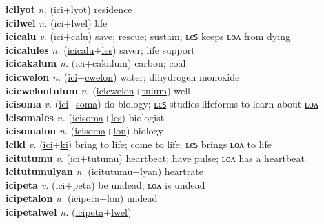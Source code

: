 \textbf{icilyot} \textit{n.} (\hyperref[ici]{ici}+\hyperref[lyot]{lyot})
residence \label{icilyot} \\
\textbf{icilwel} \textit{n.} (\hyperref[ici]{ici}+\hyperref[lwel]{lwel})
life \label{icilwel} \\
\textbf{icicalu} \textit{v.} (\hyperref[ici]{ici}+\hyperref[calu]{calu})
save; rescue; sustain; \hyperref[icicalules]{ʟєꜱ} keeps ʟᴏᴧ from dying \label{icicalu} \\
\textbf{icicalules} \textit{n.} (\hyperref[icicalu]{icicalu}+\hyperref[les]{les})
saver; life support \label{icicalules} \\
\textbf{icicakalum} \textit{n.} (\hyperref[ici]{ici}+\hyperref[cakalum]{cakalum})
carbon; coal \label{icicakalum} \\
\textbf{icicwelon} \textit{n.} (\hyperref[ici]{ici}+\hyperref[cwelon]{cwelon})
water; dihydrogen monoxide \label{icicwelon} \\
\textbf{icicwelontulum} \textit{n.} (\hyperref[icicwelon]{icicwelon}+\hyperref[tulum]{tulum})
well \label{icicwelontulum} \\
\textbf{icisoma} \textit{v.} (\hyperref[ici]{ici}+\hyperref[soma]{soma})
do biology; \hyperref[icisomales]{ʟєꜱ} studies lifeforms to learn about \hyperref[icisomalon]{ʟᴏᴧ} \label{icisoma} \\
\textbf{icisomales} \textit{n.} (\hyperref[icisoma]{icisoma}+\hyperref[les]{les})
biologist \label{icisomales} \\
\textbf{icisomalon} \textit{n.} (\hyperref[icisoma]{icisoma}+\hyperref[lon]{lon})
biology \label{icisomalon} \\
\textbf{iciki} \textit{v.} (\hyperref[ici]{ici}+\hyperref[ki]{ki})
bring to life; come to life; ʟєꜱ brings ʟᴏᴧ to life \label{iciki} \\
\textbf{icitutumu} \textit{v.} (\hyperref[ici]{ici}+\hyperref[tutumu]{tutumu})
heartbeat; have pulse; ʟᴏᴧ has a heartbeat \label{icitutumu} \\
\textbf{icitutumulyan} \textit{n.} (\hyperref[icitutumu]{icitutumu}+\hyperref[lyan]{lyan})
heartrate \label{icitutumulyan} \\
\textbf{icipeta} \textit{v.} (\hyperref[ici]{ici}+\hyperref[peta]{peta})
be undead; \hyperref[icipetalon]{ʟᴏᴧ} is undead \label{icipeta} \\
\textbf{icipetalon} \textit{n.} (\hyperref[icipeta]{icipeta}+\hyperref[lon]{lon})
undead \label{icipetalon} \\
\textbf{icipetalwel} \textit{n.} (\hyperref[icipeta]{icipeta}+\hyperref[lwel]{lwel})
